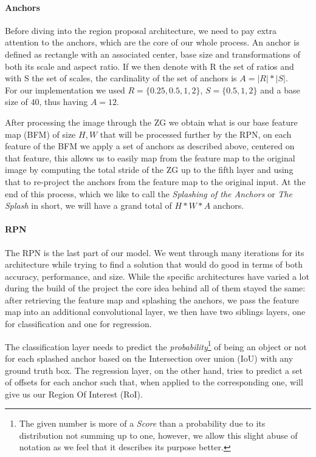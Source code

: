\documentclass[10pt,journal,cspaper,compsoc]{IEEEtran}
\begin{document}
   \paragraph*{Anchors}
    Before diving into the region proposal architecture, we need to pay extra attention to the anchors, which are the core of our whole process. An anchor is defined as rectangle with an associated center, base size and transformations of both its scale and aspect ratio. %
   If we then denote with R the set of ratios and with S the set of scales, the cardinality of the set of anchors is $A = |R| * |S|$. \\
   For our implementation we used $R=\{0.25, 0.5, 1, 2\}$, $S=\{0.5, 1, 2\}$ and a base size of $40$, thus having $A = 12$.

   After processing the image through the ZG we obtain what is our base feature map (BFM) of size $H, W$ that will be processed further by the RPN, on each feature of the BFM we apply a set of anchors as described above, centered on that feature, this allows us to easily map from the feature map to the original image by computing the total stride of the ZG up to the fifth layer and using that to re-project the anchors from the feature map to the original input.
   At the end of this process, which we like to call the \emph{Splashing of the Anchors} or \emph{The Splash} in short, we will have a grand total of $H*W*A$ anchors.
  \paragraph*{RPN}
    The RPN is the last part of our model. We went through many iterations for its architecture while trying to find a solution that would do good in terms of both accuracy, performance, and size. While the specific architectures have varied a lot during the build of the project the core idea behind all of them stayed the same: after retrieving the feature map and splashing the anchors, we pass the feature map into an additional convolutional layer,
    we then have two siblings layers, one for classification and one for regression. 
    
    The classification layer needs to predict the \emph{probability}\footnote{The given number is more of a \emph{Score} than a probability due to its distribution not summing up to one, however, we allow this slight abuse of notation as we feel that it describes its purpose better.} of being an object or not for each splashed anchor based on the Intersection over union (IoU) with any ground truth box. The regression layer, on the other hand, tries to predict a set of offsets for each anchor such that, when applied to the corresponding one, will give us our Region Of Interest (RoI).
\end{document}
